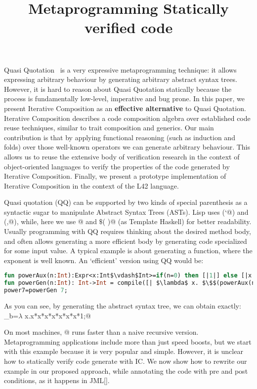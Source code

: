\documentclass[a4paper,twoside,british,9pt]{extarticle}
\begin{document}
\title{Metaprogramming Statically verified code}
\date{}
\maketitle
\vspace{-10ex}
Quasi Quotation~\cite{moggi1999idealized,pitman1980special,sheard2002template}
is a very expressive metaprogramming technique: it allows expressing arbitrary behaviour by
generating arbitrary abstract syntax trees.
However, it is hard to reason about Quasi Quotation statically because
the process is fundamentally low-level, imperative and bug prone.
In this paper, we present Iterative Composition as
an \textbf{effective alternative} to Quasi Quotation.
Iterative Composition describes a code composition algebra over established code reuse techniques,
similar to trait composition and generics.
Our main contribution is that by applying functional reasoning (such as induction and folds)
over those well-known operators we can generate arbitrary behaviour.
This allows us to reuse the extensive body of verification research in the 
context of object-oriented languages to verify the properties
of the code generated by Iterative Composition.
Finally, we present a prototype implementation of Iterative Composition in the context of the L42 language.

Quasi quotation (QQ) can be supported by two kinds of special parenthesis as a syntactic sugar to manipulate Abstract Syntax Trees (ASTs).
Lisp uses (\Q@`@) and (\Q@,@), while, here we use
\Q@[|  |]@  and \Q@$\$$(  )@ (as Template Haskell) 
for better readability.
Usually programming with QQ requires thinking about the desired method body,
 and often allows generating a more efficient body by generating code specialized for some input value.
A typical example is about generating a \Q@pow@ function, where the exponent is well known.
An `efficient' version using QQ would be:
\begin{lstlisting}[language=ML]
fun powerAux(n:Int):Expr<x:Int$\vdash$Int>=if(n=0) then [|1|] else [|x * $\$$(powerAux(n-1)) |];
fun powerGen(n:Int): Int->Int = compile([| $\lambda$ x. $\$$(powerAux(n)) |]);
power7=powerGen 7;
\end{lstlisting}

\noindent As you can see, by generating the abstract syntax tree, we can obtain exactly:
_b=$\lambda$ x.x*x*x*x*x*x*x*1;@

\noindent On most machines, @ runs faster than a naive recursive version.
Metaprogramming applications include more than just speed boosts, but we start with this example because it is very popular and simple.
However, it is unclear how to statically verify
code generate with IC.
We now show how to rewrite our \Q@pow@ example
in our proposed approach, while annotating the code with pre and post conditions, as it happens in JML[].
\newcommand\thisExp{\ensuremath{{}^{\textbf{this.exp()}}}}
\newcommand\thisSuperExp{\ensuremath{{}^{\textbf{this.superExp()}}}}
\newcommand\oneThisSuperExp{\ensuremath{{}^{\textbf{1+this.superExp()}}}}
\newcommand\powerY{\ensuremath{{}^{\textbf{y}}}}
\end{document}
